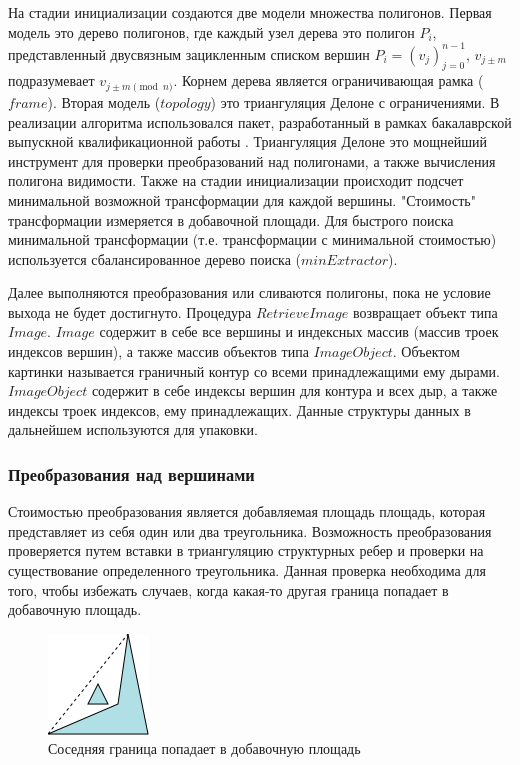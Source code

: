 \documentclass{fefu_thesis/cls/fefu}
\begin{document}
    На стадии инициализации создаются две модели множества полигонов. Первая модель это дерево полигонов, где каждый узел дерева это полигон $P_i$, представленный двусвязным зацикленным списком вершин $P_i = \left(v_j\right)_{j=0}^{n - 1}$, $v_{j \pm m}$ подразумевает $v_{j \pm m \pmod n}$. Корнем дерева является ограничивающая рамка ($frame$). Вторая модель ($topology$) это триангуляция Делоне с ограничениями. В реализации алгоритма использовался пакет, разработанный в рамках бакалаврской выпускной квалификационной работы \cite{Delaunay}. Триангуляция Делоне это мощнейший инструмент для проверки преобразований над полигонами, а также вычисления полигона видимости. Также на стадии инициализации происходит подсчет минимальной возможной трансформации для каждой вершины. "Стоимость" трансформации измеряется в добавочной площади. Для быстрого поиска минимальной трансформации (т.е. трансформации с минимальной стоимостью) используется сбалансированное дерево поиска ($minExtractor$).

    Далее выполняются преобразования или сливаются полигоны, пока не условие выхода не будет достигнуто. Процедура $RetrieveImage$ возвращает объект типа $Image$. $Image$ содержит в себе все вершины и индексных массив (массив троек индексов вершин), а также массив объектов типа $ImageObject$. Объектом картинки называется граничный контур со всеми принадлежащими ему дырами. $ImageObject$ содержит в себе индексы вершин для контура и всех дыр, а также индексы троек индексов, ему принадлежащих. Данные структуры данных в дальнейшем используются для упаковки.

    \subsubsection{Преобразования над вершинами}
    Стоимостью преобразования является добавляемая площадь площадь, которая представляет из себя один или два треугольника. Возможность преобразования проверяется путем вставки в триангуляцию структурных ребер и проверки на существование определенного треугольника. Данная проверка необходима для того, чтобы избежать случаев, когда какая-то другая граница попадает в добавочную площадь.

    \begin{figure}[H]
        \centering
        \includegraphics[scale=1]{images/triangle_existance_check.png}
        \caption{Соседняя граница попадает в добавочную площадь}
    \end{figure}
\end{document}
